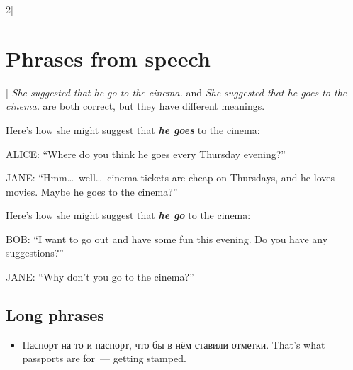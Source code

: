 \documentclass[10pt,a4paper]{article}
\newlength{\OriginalParIndent}
\newcommand\ex[1]{\textit{\textbf{{#1}}}}           %
\newenvironment{ItemizeWithOrigParIndent}
    {\begin{itemize}[leftmargin=\OriginalParIndent]}
    {\end{itemize}}
\begin{document}
\begin{multicols}{2}[\section{Phrases from speech}]
   \textit{She suggested that he go to the cinema.} and \textit{She suggested that he goes to the cinema.} are both correct, but they have different meanings.

   Here's how she might suggest that \ex{he goes} to the cinema:

   ALICE: ``Where do you think he goes every Thursday evening?''

   JANE: ``Hmm\dots\ well\dots\ cinema tickets are cheap on Thursdays, and he loves movies. Maybe he goes to the cinema?''

   Here's how she might suggest that \ex{he go} to the cinema:

   BOB: ``I want to go out and have some fun this evening. Do you have any suggestions?''

   JANE: ``Why don't you go to the cinema?''


\subsection{Long phrases}
\begin{ItemizeWithOrigParIndent}
   \item Паспорт на то и паспорт, что бы в нём ставили отметки. That's what passports are
   for~--- getting stamped.
\end{ItemizeWithOrigParIndent}
\end{multicols}

















\newpage
\setcounter{secnumdepth}{3} %
\end{document}
